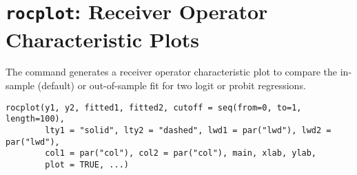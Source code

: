  \section{{\tt rocplot}: Receiver Operator Characteristic Plots}\label{ss:rocplot}
\begin{Description}\relax
The  command generates a receiver operator
characteristic plot to compare the in-sample (default) or out-of-sample
fit for two logit or probit regressions.
\end{Description}
\begin{Usage}
\begin{verbatim}
rocplot(y1, y2, fitted1, fitted2, cutoff = seq(from=0, to=1, length=100), 
        lty1 = "solid", lty2 = "dashed", lwd1 = par("lwd"), lwd2 = par("lwd"),
        col1 = par("col"), col2 = par("col"), main, xlab, ylab,
        plot = TRUE, ...)
\end{verbatim}
\end{Usage}
